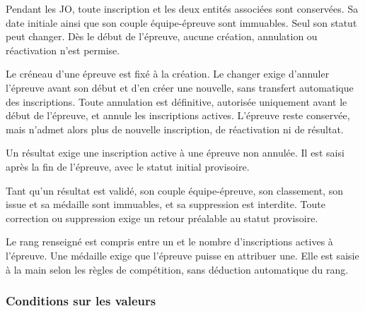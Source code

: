 \begin{contraintes}[itemsep=0.5\baselineskip]
  \item \label{ctr:historique-inscriptions} Pendant les JO, toute inscription et les deux entités associées sont conservées. Sa date initiale ainsi que son couple équipe-épreuve sont immuables. Seul son statut peut changer. Dès le début de l'épreuve, aucune création, annulation ou réactivation n'est permise.

  \item \label{ctr:annulation-epreuve}  Le créneau d'une épreuve est fixé à la création. Le changer exige d'annuler l'épreuve avant son début et d'en créer une nouvelle, sans transfert automatique des inscriptions. Toute annulation est définitive, autorisée uniquement avant le début de l'épreuve, et annule les inscriptions actives. L'épreuve reste conservée, mais n'admet alors plus de nouvelle inscription, de réactivation ni de résultat.

  \item \label{ctr:validation-resultat}  Un résultat exige une inscription active à une épreuve non annulée. Il est saisi après la fin de l'épreuve, avec le statut initial provisoire.

  \item \label{ctr:correction-resultat}  Tant qu'un résultat est validé, son couple équipe-épreuve, son classement, son issue et sa médaille sont immuables, et sa suppression est interdite. Toute correction ou suppression exige un retour préalable au statut provisoire.

  \item \label{ctr:rang-maximal}  Le rang renseigné est compris entre un et le nombre d'inscriptions actives à l'épreuve. Une médaille exige que l'épreuve puisse en attribuer une. Elle est saisie à la main selon les règles de compétition, sans déduction automatique du rang.

\end{contraintes}

\clearpage
\subsubsection{Conditions sur les valeurs}


